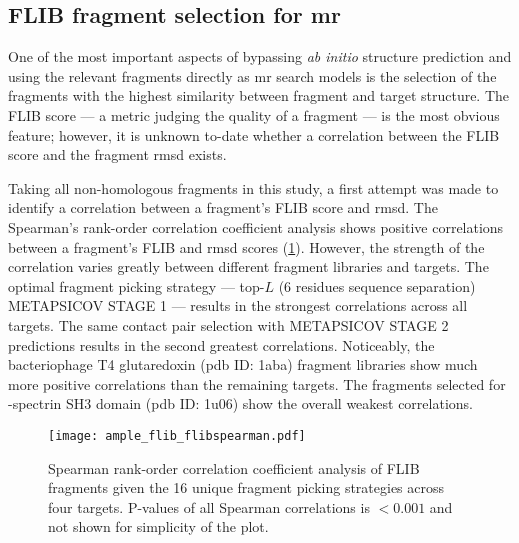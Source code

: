 \subsection{FLIB fragment selection for \acrlong{mr}}
One of the most important aspects of bypassing \textit{ab initio} structure prediction and using the relevant fragments directly as \gls{mr} search models is the selection of the fragments with the highest similarity between fragment and target structure. The FLIB score --- a metric judging the quality of a fragment --- is the most obvious feature; however, it is unknown to-date whether a correlation between the FLIB score and the fragment \gls{rmsd} exists. 

Taking all non-homologous fragments in this study, a first attempt was made to identify a correlation between a fragment's FLIB score and \gls{rmsd}. The Spearman's rank-order correlation coefficient analysis shows positive correlations between a fragment's FLIB and \gls{rmsd} scores (\cref{fig:ample_flib_flibspearman}). However, the strength of the correlation varies greatly between different fragment libraries and targets. The optimal fragment picking strategy --- top-$L$ (6 residues sequence separation) METAPSICOV STAGE 1 --- results in the strongest correlations across all targets. The same contact pair selection with METAPSICOV STAGE 2 predictions results in the second greatest correlations. Noticeably, the bacteriophage T4 glutaredoxin (\gls{pdb} ID: 1aba) fragment libraries show much more positive correlations than the remaining targets. The fragments selected for \textalpha-spectrin SH3 domain (\gls{pdb} ID: 1u06) show the overall weakest correlations.

\begin{figure}[H]
	\centering
	\texttt{[image: ample\_flib\_flibspearman.pdf]}
	\caption[Spearman rank-order correlation coefficient analysis of FLIB fragments]{Spearman rank-order correlation coefficient analysis of FLIB fragments given the 16 unique fragment picking strategies across four targets. P-values of all Spearman correlations is $<0.001$ and not shown for simplicity of the plot.}
	\label{fig:ample_flib_flibspearman}
\end{figure}

